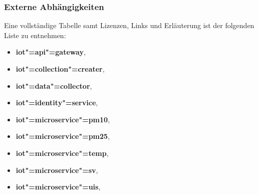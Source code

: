 \subsubsection{Externe Abhängigkeiten}
\label{sec:iot:extAbh}
Eine vollständige Tabelle samt Lizenzen, Links und Erläuterung ist der folgenden Liste zu entnehmen:
\begin{itemize}
	\item \textbf{iot"=api"=gateway},  
	\item \textbf{iot"=collection"=creater},  
	\item \textbf{iot"=data"=collector}, 
	\item \textbf{iot"=identity"=service}, 
	\item \textbf{iot"=microservice"=pm10}, 
	\item \textbf{iot"=microservice"=pm25}, 
	\item \textbf{iot"=microservice"=temp}, 
	\item \textbf{iot"=microservice"=sv}, 
	\item \textbf{iot"=microservice"=uis}, 
\end{itemize}

